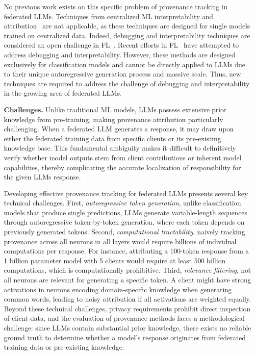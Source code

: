 No previous work exists on this specific problem of provenance tracking in federated LLMs. 
Techniques from centralized ML interpretability and attribution~\cite{} are not applicable, as these techniques are designed for single models trained on centralized data. 
Indeed, debugging and interpretability techniques are considered an open challenge in FL~\cite{kairouz2021advances}. Recent efforts in FL~\cite{liu2021enabling, tracefl, feddebug, feddefender} have attempted to address debugging and interpretability. 
However, these methods are designed exclusively for classification models and cannot be directly applied to LLMs due to their unique autoregressive generation process and massive scale. 
Thus, new techniques are required to address the challenge of debugging and interpretability in the growing area of federated LLMs.



\textbf{Challenges.} Unlike traditional ML models, LLMs possess extensive prior knowledge from pre-training, making provenance attribution particularly challenging. 
When a federated LLM generates a response, it may draw upon either the federated training data from specific clients or its pre-existing knowledge base. 
This fundamental ambiguity makes it difficult to definitively verify whether model outputs stem from client contributions or inherent model capabilities, thereby complicating the accurate localization of responsibility for the given LLMs response. 


Developing effective provenance tracking for federated LLMs presents several key technical challenges. 
First, \emph{autoregressive token generation}, unlike classification models that produce single predictions, LLMs generate variable-length sequences through autoregressive token-by-token generation, where each token depends on previously generated tokens.  
Second, \emph{computational tractability}, naively tracking provenance across all neurons in all layers would require billions of individual computations per response. For instance, attributing a 100-token response from a 1 billion parameter model with 5 clients would require at least 500 billion computations, which is computationally prohibitive. 
Third, \emph{relevance filtering}, not all neurons are relevant for generating a specific token. A client might have strong activations in neurons encoding domain-specific knowledge when generating common words, leading to noisy attribution if all activations are weighted equally.
Beyond these technical challenges, privacy requirements prohibit direct inspection of client data, and the evaluation of provenance methods faces a methodological challenge: since LLMs contain substantial prior knowledge, there exists no reliable ground truth to determine whether a model's response originates from federated training data or pre-existing knowledge.



